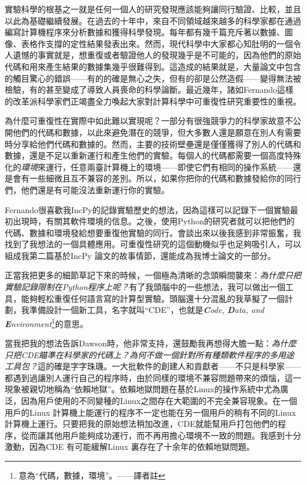 \documentclass[12pt,UTF8,nofonts]{book}
\begin{document}
實驗科學的根基之一就是任何一個人的研究發現應該能夠讓同行驗證、比較，並且以此為基礎繼續發展。在過去的十年中，來自不同領域越來越多的科學家都在通過編寫計算機程序來分析數據和獲得科學發現。每年都有幾千篇充斥著以數據、圖像、表格作支撐的定性結果發表出來。然而，現代科學中大家都心知肚明的一個令人遺憾的事實就是，想重復或者驗證他人的發現幾乎是不可能的，因為他們的原始代碼和用來產生結果的數據集幾乎很難得到。這造成的結果就是，大量論文中包含的觸目驚心的錯誤——有的的確是無心之失，但有的卻是公然造假——變得無法被檢驗，有的甚至變成了導致人員喪命的科學論斷。最近幾年，諸如Fernando這樣的改革派科學家們正竭盡全力喚起大家對計算科學中可重復性研究重要性的重視。

為什麼可重復性在實際中如此難以實現呢？一部分有很強競爭力的科學家故意不公開他們的代碼和數據，以此來避免潛在的競爭，但大多數人還是願意在別人有需要時分享給他們代碼和數據的。然而，主要的技術壁壘還是僅僅獲得了別人的代碼和數據，還是不足以重新運行和產生他們的實驗。每個人的代碼都需要一個高度特殊化的\emph{環境}來運行，任意兩臺計算機上的環境——即使它們有相同的操作系統——還是會有一些細微且互不兼容的差別。所以，如果你把你的代碼和數據發給你的同行們，他們還是有可能沒法重新運行你的實驗。

Fernando很喜歡我IncPy的記錄實驗歷史的想法，因為這樣可以記錄下一個實驗最初出現時，有關其軟件環境的信息。之後，使用Python的研究者就可以把他們的代碼、數據和環境發給想要重復他實驗的同行。會談出來以後我感到非常振奮，我找到了我想法的一個具體應用。可重復性研究的這個動機似乎也足夠吸引人，可以組成我第二篇基於IncPy 論文的故事情節，還能成為我博士論文的一部分。

正當我把更多的細節草記下來的時候，一個極為清晰的念頭瞬間襲來：\emph{為什麼只把實驗記錄限制在Python程序上呢？}有了我頭腦中的一些想法，我可以做出一個工具，能夠輕松重復任何語言寫的計算型實驗。頭腦還十分混亂的我草擬了一個計劃，我準備設計一個新工具，名字就叫“CDE”，也就是\emph{\textbf{C}ode, \textbf{D}ata, and \textbf{E}nvironment}\footnote{意為“代碼，數據，環境”。——譯者註}的意思。

\breakline

當我把我的想法告訴Dawson時，他非常支持，還鼓勵我再想得大膽一點：\emph{為什麼只把CDE瞄準在科學家的代碼上？為何不做一個針對所有種類軟件程序的多用途工具包？}這的確是字字珠璣。一大批軟件的創建人和貢獻者——不只是科學家——都遇到過讓別人運行自己的程序時，由於同樣的環境不兼容問題帶來的煩惱，這一現象被親切地稱為“依賴地獄”。依賴地獄問題在基於Linux的操作系統中尤為廣泛，因為用戶使用的不同變種的Linux之間存在大範圍的不完全兼容現象。在一個用戶的Linux 計算機上能運行的程序不一定也能在另一個用戶的稍有不同的Linux計算機上運行。只要把我的原始想法稍加改進，CDE就能幫用戶打包他們的程序，從而讓其他用戶能夠成功運行，而不再用擔心環境不一致的問題。我感到十分激動，因為CDE 有可能緩解Linux 裏存在了十余年的依賴地獄問題。
\end{document}
